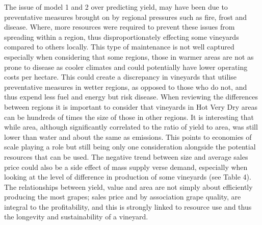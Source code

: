 \documentclass[
  journal=large,
  manuscript=article-type,
  year=2023,
  volume=?,
]{cup-journal}
\begin{document}
The issue of model 1 and 2 over predicting yield, may have been due to preventative measures brought on by regional pressures such as fire, frost and disease. Where, more resources were required to prevent these issues from spreading within a region, thus disproportionately effecting some vineyards compared to others locally. This type of maintenance is not well captured especially when considering that some regions, those in warmer areas are not as prone to disease as cooler climates and could potentially have lower operating costs per hectare. This could create a discrepancy in vineyards that utilise preventative measures in wetter regions, as opposed to those who do not, and thus expend less fuel and energy but risk disease. When reviewing the differences between regions it is important to consider that vineyards in Hot Very Dry areas can be hundreds of times the size of those in other regions. It is interesting that while area, although significantly correlated to the ratio of yield to area, was still lower than water and about the same as emissions. This points to economies of scale playing a role but still being only one consideration alongside the potential resources that can be used. The negative trend between size and average sales price could also be a side effect of mass supply verse demand, especially when looking at the level of difference in production of some vineyards (see Table 4). The relationships between yield, value and area are not simply about efficiently producing the most grapes; sales price and by association grape quality, are integral to the profitability, and this is strongly linked to resource use and thus the longevity and sustainability of a vineyard. 
\end{document}
